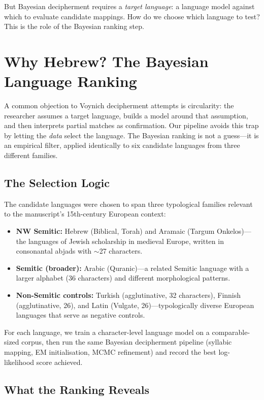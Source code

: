 \documentclass[11pt,a4paper]{article}
\begin{document}
But Bayesian decipherment requires a \emph{target language}: a language model against which to evaluate candidate mappings.  How do we choose which language to test?  This is the role of the Bayesian ranking step.


\section{Why Hebrew?  The Bayesian Language Ranking}
\label{sec:why-hebrew}

A common objection to Voynich decipherment attempts is circularity: the researcher assumes a target language, builds a model around that assumption, and then interprets partial matches as confirmation.  Our pipeline avoids this trap by letting the \emph{data} select the language.  The Bayesian ranking is not a guess---it is an empirical filter, applied identically to six candidate languages from three different families.

\subsection{The Selection Logic}

The candidate languages were chosen to span three typological families relevant to the manuscript's 15th-century European context:

\begin{itemize}[nosep]
  \item \textbf{NW Semitic:} Hebrew (Biblical, Torah) and Aramaic (Targum Onkelos)---the languages of Jewish scholarship in medieval Europe, written in consonantal abjads with $\sim$27 characters.
  \item \textbf{Semitic (broader):} Arabic (Quranic)---a related Semitic language with a larger alphabet (36 characters) and different morphological patterns.
  \item \textbf{Non-Semitic controls:} Turkish (agglutinative, 32 characters), Finnish (agglutinative, 26), and Latin (Vulgate, 26)---typologically diverse European languages that serve as negative controls.
\end{itemize}

For each language, we train a character-level language model on a comparable-sized corpus, then run the same Bayesian decipherment pipeline (syllabic mapping, EM initialisation, MCMC refinement) and record the best log-likelihood score achieved.

\subsection{What the Ranking Reveals}
\end{document}
